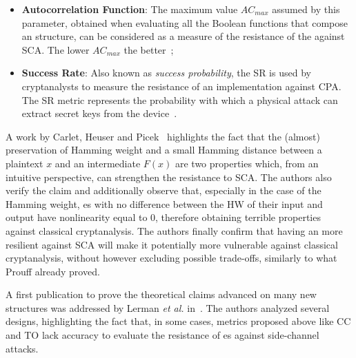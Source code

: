 \begin{itemize}
            \item \textbf{Autocorrelation Function}: The maximum value $AC_{max}$ assumed by this parameter, obtained when evaluating all the Boolean functions that compose an \sbocs{} structure, can be considered as a measure of the resistance of the \sbocs{} against SCA. The lower $AC_{max}$ the better~\cite{millan1999evolutionary};
            
            \item \textbf{Success Rate}: Also known as \emph{success probability}, the SR is used by cryptanalysts to measure the resistance of an implementation against CPA. The SR metric represents the probability with which a physical attack can extract secret keys from the device~\cite{lerman2016comparing}.
        \end{itemize}

        A work by Carlet, Heuser and Picek~\cite{carlet2017trade} highlights the fact that the (almost) preservation of Hamming weight and a small Hamming distance between a plaintext $x$ and an intermediate $F(x)$ are two properties which, from an intuitive perspective, can strengthen the resistance to SCA. The authors also verify the claim and additionally observe that, especially in the case of the Hamming weight, \sbocs{}es with no difference between the HW of their input and output have nonlinearity equal to 0, therefore obtaining terrible properties against classical cryptanalysis. The authors finally confirm that having an \sbocs{} more resilient against SCA will make it potentially more vulnerable against classical cryptanalysis, without however excluding possible trade-offs, similarly to what Prouff already proved.

        A first publication to prove the theoretical claims advanced on many new \sbocs{} structures was addressed by Lerman \emph{et al.} in~\cite{lerman2016comparing}. The authors analyzed several designs, highlighting the fact that, in some cases, metrics proposed above like CC and TO lack accuracy to evaluate the resistance of \sbocs{}es against side-channel attacks.

